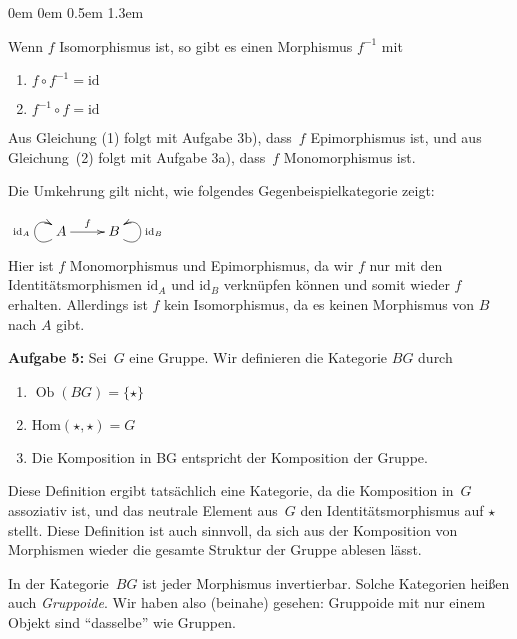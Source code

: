 \documentclass[a4paper,ngerman]{scrartcl}
\theoremstyle{definition}
\theoremstyle{plain}
\theoremstyle{remark}
\newcommand{\Hom}{\mathrm{Hom}}
\newcommand{\id}{\mathrm{id}}
\DeclareMathOperator{\Ob}{Ob}
\begin{document}
\begin{list}{}{0em \leftmargin0em \itemindent0.5em \itemsep 1.3em}
\begin{enumerate}
  Wenn $f$ Isomorphismus ist, so gibt es einen Morphismus $f^{-1}$ mit
  \begin{enumerate}[(1)]
    \item $f \circ f^{-1} = \id$
    \item $f^{-1} \circ f = \id$
  \end{enumerate}
  Aus Gleichung (1) folgt mit Aufgabe 3b), dass~$f$ Epimorphismus ist, und aus
  Gleichung~(2) folgt mit Aufgabe 3a), dass~$f$ Monomorphismus ist.

  Die Umkehrung gilt nicht, wie folgendes Gegenbeispielkategorie zeigt:

  \begin{center}
    ${\xymatrix{
      & A \ar@(dl,ul)^{\id_A} \ar[r]^f & B \ar@(dr,ur)_{\id_B} \\
    }}$
  \end{center}

  Hier ist $f$ Monomorphismus und Epimorphismus, da wir $f$ nur mit den
  Iden\-ti\-täts\-mor\-phis\-men $\id_A$ und $\id_B$ verknüpfen können und somit wieder
  $f$ erhalten. Allerdings ist $f$ kein Isomorphismus, da es keinen Morphismus
  von $B$ nach $A$ gibt.
\end{enumerate}

\item[\textbf{Aufgabe 5:}]
Sei~$G$ eine Gruppe. Wir definieren die Kategorie $BG$ durch

  \begin{enumerate}[(1)]
    \item $\Ob(BG) = \{\star\}$
    \item $\Hom(\star, \star) = G$
    \item Die Komposition in BG entspricht der Komposition der Gruppe.
  \end{enumerate}

  Diese Definition ergibt tatsächlich eine Kategorie, da die Komposition in~$G$
  assoziativ ist, und das neutrale Element aus~$G$ den Identitätsmorphismus auf
  $\star$ stellt.
  Diese Definition ist auch sinnvoll, da sich aus der Komposition von
  Morphismen wieder die gesamte Struktur der Gruppe ablesen lässt.

  In der Kategorie~$BG$ ist jeder Morphismus invertierbar. Solche Kategorien
  heißen auch \emph{Gruppoide}. Wir haben also (beinahe) gesehen: Gruppoide mit
  nur einem Objekt sind "`dasselbe"' wie Gruppen.
\end{list}
\end{document}
